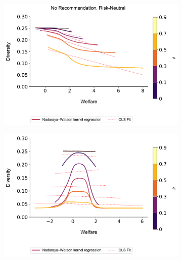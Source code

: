 \documentclass[manuscript, nonacm]{acmart}
\begin{document}
\begin{figure}[t]
\caption{Diversity vs. Welfare}
\begin{minipage}{1.2\textwidth}
\hspace*{-1cm}\begin{subfigure}{.23\textwidth}
\includegraphics[width=1.0\linewidth]{figures/diversity_welfare_rn_n_200.pdf}
\end{subfigure}
\begin{subfigure}{.23\textwidth}
\includegraphics[width=1.0\linewidth]{figures/diversity_welfare_ra_n_200.pdf}
\end{subfigure}
\begin{subfigure}{.23\textwidth}

\end{subfigure}
\end{minipage}
\end{figure}
\end{document}
